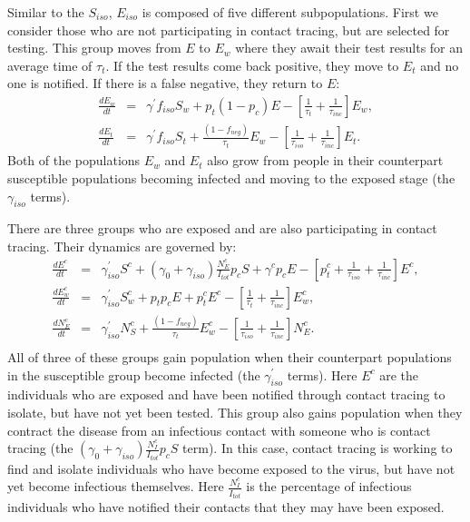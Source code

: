 \documentclass[notitlepage, superscriptaddress]{revtex4-2}
\begin{document}
Similar to the $S_{iso}$, $E_{iso}$ is composed of five different subpopulations. First we consider those who are not participating in contact tracing, but are selected for testing. This group moves from $E$ to $E_{w}$ where they await their test results for an average time of $\tau_{t}$. If the test results come back positive, they move to $E_{t}$ and no one is notified. If there is a false negative, they return to $E$:
\begin{eqnarray}
\label{E:dE_w}
\frac{dE_{w}}{dt} &=& \gamma^{'}f_{iso} S_{w} + p_{t} (1 - p_{c}) E - [\frac{1}{\tau_{t}}  + \frac{1}{\tau_{inc}}] E_{w}, \\
%
\frac{dE_{t}}{dt} &=& \gamma^{'}f_{iso} S_{t} + \frac{(1- f_{neg})}{\tau_{t}} E_{w} - [\frac{1}{\tau_{iso}}  + \frac{1}{\tau_{inc}}] E_{t}.
\end{eqnarray}
Both of the populations $E_{w}$ and $E_{t}$ also grow from people in their counterpart susceptible populations becoming infected and moving to the exposed stage (the $\gamma_{iso}$ terms). 

There are three groups who are exposed and are also participating in contact tracing. Their dynamics are governed by:
\begin{eqnarray}
\label{E:dEc}
 \frac{dE^{c}}{dt} &=& \gamma^{'}_{iso} S^{c} + (\gamma_{0} + \gamma_{iso}) \frac{N^{c}_{E}}{I_{tot}} p_c S +  \gamma^{c} p_{c} E -[p^{c}_{t} +\frac{1}{\tau_{iso}} + \frac{1}{\tau_{inc}}] E^{c}, \\
 \frac{dE^{c}_{w}}{dt} &=& \gamma^{'}_{iso} S^{c}_{w} + p_{t}p_{c} E + p^{c}_{t}E^{c} - [\frac{1}{\tau_{t}}  + \frac{1}{\tau_{inc}}] E^{c}_{w}, \\ 
 \frac{dN^{c}_{E}}{dt} &=&  \gamma^{'}_{iso} N^{c}_{S} + \frac{(1-f_{neg})}{\tau_{t}} E^{c}_{w} - [\frac{1}{\tau_{iso}}  + \frac{1}{\tau_{inc}}] N^{c}_{E}. \\ 
\end{eqnarray}
All of three of these groups gain population when their counterpart populations in the susceptible group become infected (the $\gamma^{'}_{iso}$ terms). Here $E^{c}$ are the individuals who are exposed and have been notified through contact tracing to isolate, but have not yet been tested. This group also gains population when they contract the disease from an infectious contact with someone who is contact tracing (the $(\gamma_{0} + \gamma_{iso}) \frac{N^{c}_{I}}{I_{tot}} p_c S$ term). In this case, contact tracing is working to find and isolate individuals who have become exposed to the virus, but have not yet become infectious themselves. Here $\frac{N^{c}_{I}}{I_{tot}}$ is the percentage of infectious individuals who have notified their contacts that they may have been exposed.
\end{document}
